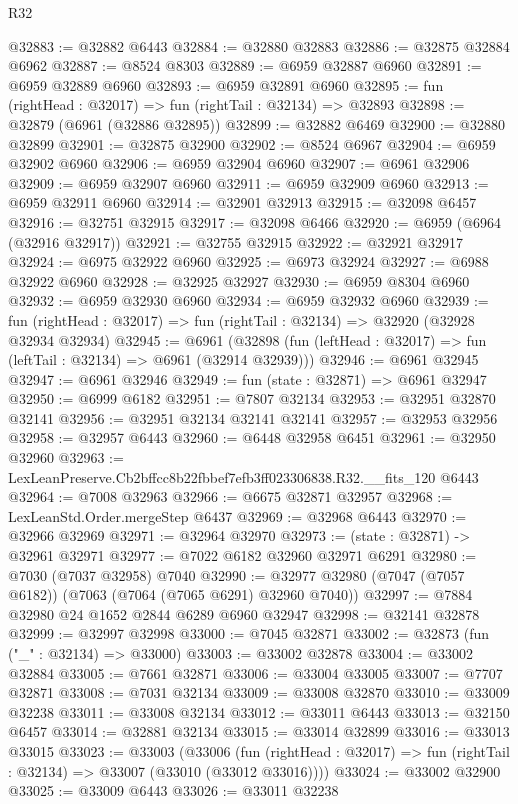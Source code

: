 \begin{lexlean}{R32}
\begin{coremodule}
@32883 := @32882 @6443
@32884 := @32880 @32883
@32886 := @32875 @32884 @6962
@32887 := @8524 @8303
@32889 := @6959 @32887 @6960
@32891 := @6959 @32889 @6960
@32893 := @6959 @32891 @6960
@32895 := fun (rightHead : @32017) => fun (rightTail : @32134) => @32893
@32898 := @32879 (@6961 (@32886 @32895))
@32899 := @32882 @6469
@32900 := @32880 @32899
@32901 := @32875 @32900
@32902 := @8524 @6967
@32904 := @6959 @32902 @6960
@32906 := @6959 @32904 @6960
@32907 := @6961 @32906
@32909 := @6959 @32907 @6960
@32911 := @6959 @32909 @6960
@32913 := @6959 @32911 @6960
@32914 := @32901 @32913
@32915 := @32098 @6457
@32916 := @32751 @32915
@32917 := @32098 @6466
@32920 := @6959 (@6964 (@32916 @32917))
@32921 := @32755 @32915
@32922 := @32921 @32917
@32924 := @6975 @32922 @6960
@32925 := @6973 @32924
@32927 := @6988 @32922 @6960
@32928 := @32925 @32927
@32930 := @6959 @8304 @6960
@32932 := @6959 @32930 @6960
@32934 := @6959 @32932 @6960
@32939 := fun (rightHead : @32017) => fun (rightTail : @32134) => @32920 (@32928 @32934 @32934)
@32945 := @6961
    (@32898 (fun (leftHead : @32017) => fun (leftTail : @32134) => @6961 (@32914 @32939)))
@32946 := @6961 @32945
@32947 := @6961 @32946
@32949 := fun (state : @32871) => @6961 @32947
@32950 := @6999 @6182
@32951 := @7807 @32134
@32953 := @32951 @32870 @32141
@32956 := @32951 @32134 @32141 @32141
@32957 := @32953 @32956
@32958 := @32957 @6443
@32960 := @6448 @32958 @6451
@32961 := @32950 @32960
@32963 := LexLeanPreserve.Cb2bffcc8b22fbbef7efb3ff023306838.R32.__fits_120 @6443
@32964 := @7008 @32963
@32966 := @6675 @32871 @32957
@32968 := LexLeanStd.Order.mergeStep @6437
@32969 := @32968 @6443
@32970 := @32966 @32969
@32971 := @32964 @32970
@32973 := (state : @32871) -> @32961 @32971
@32977 := @7022 @6182 @32960 @32971 @6291
@32980 := @7030 (@7037 @32958) @7040
@32990 := @32977 @32980 (@7047 (@7057 @6182)) (@7063 (@7064 (@7065 @6291) @32960 @7040))
@32997 := @7884 @32980 @24 @1652 @2844 @6289 @6960 @32947
@32998 := @32141 @32878
@32999 := @32997 @32998
@33000 := @7045 @32871
@33002 := @32873 (fun ("_" : @32134) => @33000)
@33003 := @33002 @32878
@33004 := @33002 @32884
@33005 := @7661 @32871
@33006 := @33004 @33005
@33007 := @7707 @32871
@33008 := @7031 @32134
@33009 := @33008 @32870
@33010 := @33009 @32238
@33011 := @33008 @32134
@33012 := @33011 @6443
@33013 := @32150 @6457
@33014 := @32881 @32134
@33015 := @33014 @32899
@33016 := @33013 @33015
@33023 := @33003
    (@33006
      (fun (rightHead : @32017) => fun (rightTail : @32134) => @33007 (@33010 (@33012 @33016))))
@33024 := @33002 @32900
@33025 := @33009 @6443
@33026 := @33011 @32238

\end{coremodule}
\end{lexlean}
